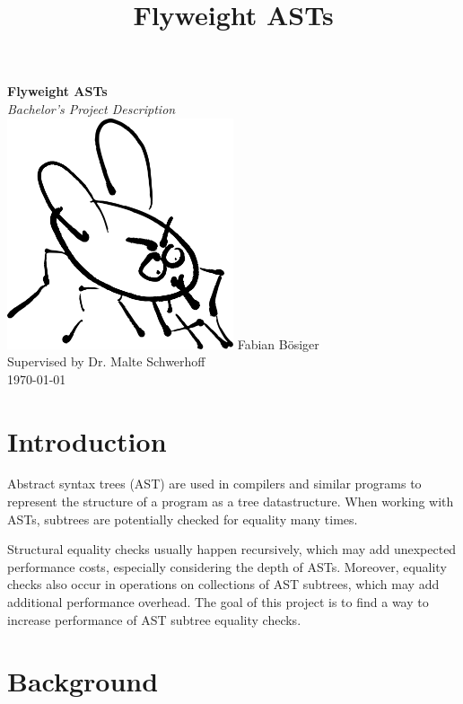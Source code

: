 \documentclass[11pt]{article}
\title{Flyweight ASTs}
\author{
    
}
\date{}
\begin{document}
    \begin{titlepage}
        \begin{center}
            \textbf{\huge Flyweight ASTs}\\
            \vspace{0.2cm}
            \textit{Bachelor's Project Description}\\
            \vspace{1cm}
            \includegraphics[width=0.5\textwidth]{fly}
            \vfill   
            Fabian Bösiger\\
            Supervised by Dr. Malte Schwerhoff\\
            \vspace{0.2cm}
            \today
        \end{center}
    \end{titlepage}
    \newpage

    \section{Introduction} \label{introduction}
    Abstract syntax trees (AST) are used in compilers and similar programs to represent
    the structure of a program as a tree datastructure. When working with ASTs,
    subtrees are potentially checked for equality many times.

    Structural equality checks usually happen recursively, which may add
    unexpected performance costs, especially considering the depth of ASTs. Moreover, equality checks
    also occur in operations on collections of AST subtrees, which may add additional performance overhead.
    The goal of this project is to find a way to increase performance of AST subtree equality checks.
    \section{Background}
\end{document}
